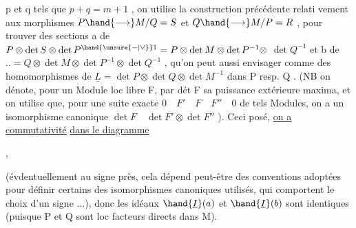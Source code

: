 
p et q tels que $p+q=m+1$ , on utilise la construction précédente relati
vement aux morphismes $P\hand{\longrightarrow} M/Q = S$ et $Q\hand{\longrightarrow} M/P = R$ , pour trouver
des sections  a de $P \otimes \det S \otimes \det P^{\hand{\unsure{-|\vee}}1} = P \otimes \det M \otimes \det P^{-1} \otimes$
$\det Q^{-1}$ et b de $.. = Q \otimes \det M \otimes \det P^{-1} \otimes \det Q^{-1}$ , qu'on peut
aussi envisager comme des homomorphismes de $\underline{L} = \det P \otimes \det Q \otimes \det M^{-1}$
dans P resp. Q . (NB on dénote, pour un Module loc libre F, par dét F
sa puissance extérieure maxima, et on utilise que, pour une suite
exacte $0 \quad F' \quad F \quad F'' \quad 0$ de tels Modules, on a un isomorphisme
canonique $\det F \quad \det F' \otimes \det F''$ ). Ceci posé, \uline{on a commutativité}
\uline{dans le diagramme}

,

(évdentuellement au signe près, cela dépend peut-être des conventions
adoptées pour définir certains des isomorphismes canoniques utilisés,
qui comportent le choix d'un signe ...), donc les idéaux $\hand{\underline{I}}(a)$ et $\hand{\underline{I}}(b)$
sont identiques (puisque P et Q sont loc facteurs directs dans M). 

